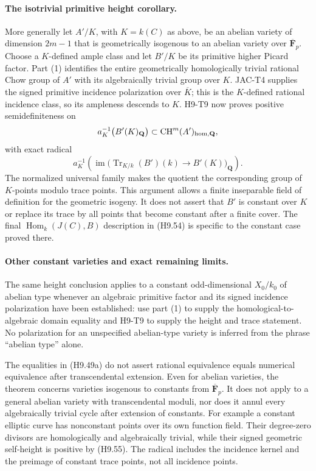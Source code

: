 \paragraph{The isotrivial primitive height corollary.}
More generally let $A'/K$, with $K=k(C)$ as above, be an abelian
variety of dimension $2m-1$ that is geometrically isogenous to an
abelian variety over $\overline{\mathbf F}_p$. Choose a $K$-defined
ample class and let $B'/K$ be its primitive higher Picard factor.
Part (1) identifies the entire geometrically homologically trivial
rational Chow group of $A'$ with its algebraically trivial group
over $K$. JAC-T4 supplies the signed primitive incidence
polarization over $\overline K$; this is the $K$-defined rational
incidence class, so its ampleness descends to $K$. H9-T9 now proves
positive semidefiniteness on
\[
 a_K^{-1}\bigl(B'(K)_{\mathbf Q}\bigr)
 \subset\operatorname{CH}^m(A')_{\rm hom,\mathbf Q},
\]
with exact radical
\[
 a_K^{-1}\!\left(
    \operatorname{im}\bigl(\operatorname{Tr}_{K/k}(B')(k)
                  \longrightarrow B'(K)\bigr)_{\mathbf Q}
             \right).
\]
The normalized universal family makes the quotient the corresponding
group of $K$-points modulo trace points. This argument allows a
finite inseparable field of definition for the geometric isogeny.
It does not assert that $B'$ is constant over $K$ or replace its
trace by all points that become constant after a finite cover.
The final $\operatorname{Hom}_k(J(C),B)$ description in (H9.54)
is specific to the constant case proved there.

\paragraph{Other constant varieties and exact remaining limits.}
The same height conclusion applies to a constant odd-dimensional
$X_0/k_0$ of abelian type whenever an algebraic primitive factor and
its signed incidence polarization have been established: use part (1)
to supply the homological-to-algebraic domain equality and H9-T9 to
supply the height and trace statement. No polarization for an
unspecified abelian-type variety is inferred from the phrase
``abelian type'' alone.

The equalities in (H9.49a) do not assert rational equivalence equals
numerical equivalence after transcendental extension. Even for
abelian varieties, the theorem concerns varieties isogenous
to constants from $\overline{\mathbf F}_p$. It does not apply to a
general abelian variety with transcendental moduli, nor does it
annul every algebraically trivial cycle after extension of constants.
For example a constant elliptic curve has nonconstant points over
its own function field. Their degree-zero divisors are homologically
and algebraically trivial, while their signed geometric self-height
is positive by (H9.55). The radical includes the incidence kernel
and the preimage of constant trace points, not all incidence points.


